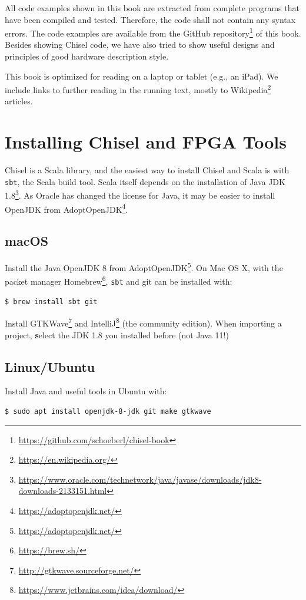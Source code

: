 \documentclass[%
    10pt,
    headinclude, footexclude,
    openright, %
    notitlepage,
    cleardoubleempty,
    headsepline,
    pointlessnumbers,
    bibtotoc, idxtotoc,
    ]{scrbook}
\newcommand{\code}[1]{{\small{\texttt{#1}}}}
\newcommand{\myref}[2]{\href{#1}{#2}}
\renewcommand{\myref}[2]{{#2}{\footnote{\url{#1}}}}
\begin{document}
All code examples shown in this book are extracted from complete programs
that have been compiled and tested. Therefore, the code shall not contain
any syntax errors. The code examples are available from the
\myref{https://github.com/schoeberl/chisel-book}{GitHub repository}
of this book.
Besides showing Chisel code, we have also tried to show useful designs and
principles of good hardware description style.

This book is optimized for reading on a laptop or tablet (e.g., an iPad).
We include links to further reading in the running text, mostly to
\myref{https://en.wikipedia.org/}{Wikipedia} articles.

\section{Installing Chisel and FPGA Tools}

Chisel is a Scala library, and the easiest way to install Chisel and Scala is
with \code{sbt}, the Scala build tool. Scala itself depends on the installation
of \myref{https://www.oracle.com/technetwork/java/javase/downloads/jdk8-downloads-2133151.html}{Java JDK 1.8}. As Oracle has changed the license for Java, it may be easier to
install OpenJDK from \myref{https://adoptopenjdk.net/}{AdoptOpenJDK}.

\subsection{macOS}

Install the Java OpenJDK 8 from \myref{https://adoptopenjdk.net/}{AdoptOpenJDK}.
On Mac OS X, with the packet manager \myref{https://brew.sh/}{Homebrew},
\code{sbt} and git can be installed with:

\begin{verbatim}
$ brew install sbt git
\end{verbatim}

Install \myref{http://gtkwave.sourceforge.net/}{GTKWave} and
\myref{https://www.jetbrains.com/idea/download/}{IntelliJ} (the community edition).
When importing a project, {\textbf select the JDK 1.8} you installed before (not Java 11!)

\subsection{Linux/Ubuntu}

Install Java and useful tools in Ubuntu with:
\begin{verbatim}
$ sudo apt install openjdk-8-jdk git make gtkwave
\end{verbatim}
\end{document}
